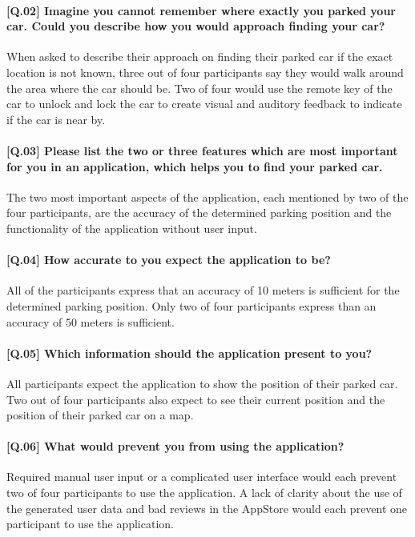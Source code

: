 \paragraph{[Q.02] Imagine you cannot remember where exactly you parked your car. Could you describe how you would approach finding your car?}
When asked to describe their approach on finding their parked car if the exact location is not known, three out of four participants say they would walk around the area where the car should be. Two of four would use the remote key of the car to unlock and lock the car to create visual and auditory feedback to indicate if the car is near by.

\paragraph{[Q.03] Please list the two or three features which are most important for you in an application, which helps you to find your parked car.}
The two most important aspects of the application, each mentioned by two of the four participants, are the accuracy of the determined parking position and the functionality of the application without user input.

\paragraph{[Q.04] How accurate to you expect the application to be?}
All of the participants express that an accuracy of 10 meters is sufficient for the determined parking position. Only two of four participants express than an accuracy of 50 meters is sufficient.

\paragraph{[Q.05] Which information should the application present to you?}
All participants expect the application to show the position of their parked car. Two out of four participants also expect to see their current position and the position of their parked car on a map. 

\paragraph{[Q.06] What would prevent you from using the application?}
Required manual user input or a complicated user interface would each prevent two of four participants to use the application. A lack of clarity about the use of the generated user data and bad reviews in the AppStore would each prevent one participant to use the application.


